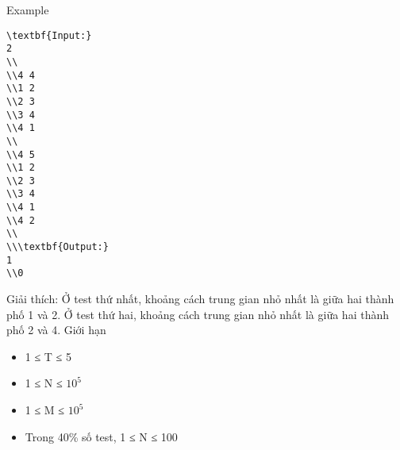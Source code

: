Example
\begin{verbatim}
\textbf{Input:}
2
\\
\\4 4
\\1 2
\\2 3
\\3 4
\\4 1
\\
\\4 5 
\\1 2
\\2 3
\\3 4
\\4 1
\\4 2
\\
\\\textbf{Output:}
1
\\0\end{verbatim}

Giải thích: Ở test thứ nhất, khoảng cách trung gian nhỏ nhất là giữa hai thành phố 1 và 2. Ở test thứ hai, khoảng cách trung gian nhỏ nhất là giữa hai thành phố 2 và 4.
Giới hạn
\begin{itemize}
	\item     1 ≤ T ≤ 5   
	\item     1 ≤ N ≤ $10^{5}$
	\item     1 ≤ M ≤ $10^{5}$
	\item     Trong 40\% số test, 1 ≤ N ≤ 100   
\end{itemize}